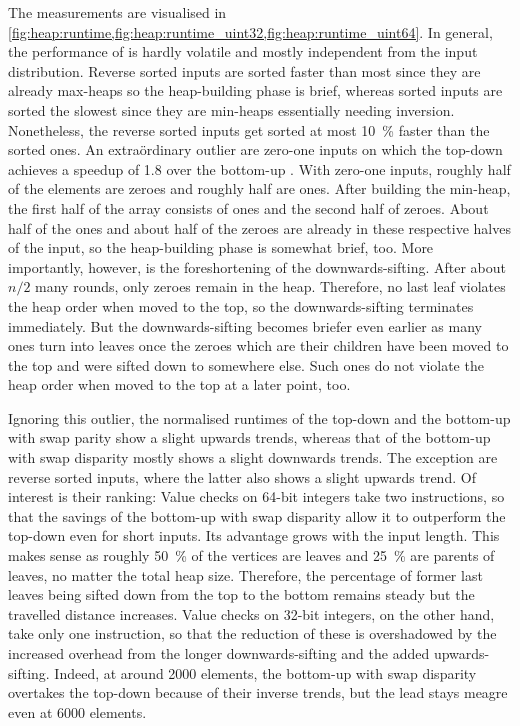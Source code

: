 The measurements are visualised in \cref{fig:heap:runtime,fig:heap:runtime_uint32,fig:heap:runtime_uint64}.
In general, the performance of \HS{} is hardly volatile and mostly independent from the input distribution.
Reverse sorted inputs are sorted faster than most since they are already max-heaps so the heap-building phase is brief, whereas sorted inputs are sorted the slowest since they are min-heaps essentially needing inversion.
Nonetheless, the reverse sorted inputs get sorted at most \qty{10}{\percent} faster than the sorted ones.
An extraördinary outlier are zero-one inputs on which the top-down \HS{} achieves a speedup of \num{1.8} over the bottom-up \HS{}.
With zero-one inputs, roughly half of the elements are zeroes and roughly half are ones.
After building the min-heap, the first half of the array consists of ones and the second half of zeroes.
About half of the ones and about half of the zeroes are already in these respective halves of the input, so the heap-building phase is somewhat brief, too.
More importantly, however, is the foreshortening of the downwards-sifting.
After about \(n/2\) many rounds, only zeroes remain in the heap.
Therefore, no last leaf violates the heap order when moved to the top, so the downwards-sifting terminates immediately.
But the downwards-sifting becomes briefer even earlier as many ones turn into leaves once the zeroes which are their children have been moved to the top and were sifted down to somewhere else.
Such ones do not violate the heap order when moved to the top at a later point, too.


Ignoring this outlier, the normalised runtimes of the top-down \HS{} and the bottom-up \HS{} with swap parity show a slight upwards trends, whereas that of the bottom-up \HS{} with swap disparity mostly shows a slight downwards trends.
The exception are reverse sorted inputs, where the latter also shows a slight upwards trend.
Of interest is their ranking:
Value checks on 64-bit integers take two instructions, so that the savings of the bottom-up \HS{} with swap disparity allow it to outperform the top-down \HS{} even for short inputs.
Its advantage grows with the input length.
This makes sense as roughly \qty{50}{\percent} of the vertices are leaves and \qty{25}{\percent} are parents of leaves, no matter the total heap size.
Therefore, the percentage of former last leaves being sifted down from the top to the bottom remains steady but the travelled distance increases.
Value checks on 32-bit integers, on the other hand, take only one instruction, so that the reduction of these is overshadowed by the increased overhead from the longer downwards-sifting and the added upwards-sifting.
Indeed, at around 2000 elements, the bottom-up \HS{} with swap disparity overtakes the top-down \HS{} because of their inverse trends, but the lead stays meagre even at \num{6000} elements.

